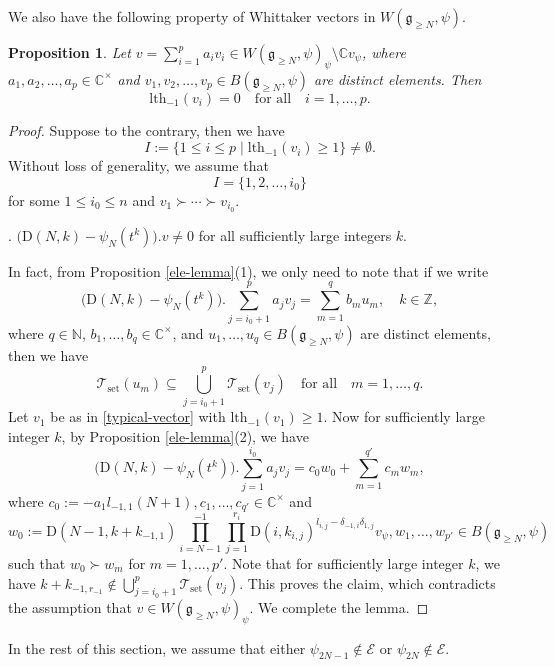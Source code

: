 \documentclass[12pt, a4paper]{amsart}
\newcommand{\fg}{\mathfrak g}
\newcommand{\C}{\mathbb{C}}
\newcommand{\N}{\mathbb N}
\newcommand{\Z}{\mathbb Z}
\newcommand{\rD}{\mathrm{D}}
\theoremstyle{Theorem}
\theoremstyle{Theorem}
\newtheorem{proposition}[thm]{Proposition}
\numberwithin{equation}{section}
\begin{document}
We also have the following property of Whittaker vectors in $W(\fg_{\geq N},\psi)$.
\begin{proposition}\label{some-property-Whit}
Let $v=\sum_{i=1}^{p}a_{i}v_{i}\in W(\fg_{\geq N},\psi)_{\psi}\setminus \C v_{\psi}$,
where $a_{1},a_{2},\dots,a_{p}\in\C^{\times}$ and $v_{1},v_{2},\dots,v_{p}\in B(\fg_{\geq N},\psi)$ are distinct elements.
Then \[\mathrm{lth}_{-1}(v_{i})=0\quad \text{for all}\quad i=1,\dots,p.\]
\end{proposition}
\begin{proof}
Suppose to the contrary, then we have \[I:=\{1\leq i\leq p\mid\mathrm{lth}_{-1}(v_{i})\geq1\}\neq\emptyset.\]
Without loss of generality, we assume that
\[I=\{1,2,\dots,i_{0}\}\]
for some $1\leq i_{0}\leq n$ and $v_{1}\succ\cdots\succ v_{i_{0}}$.

\vspace{2mm}

. $\big(\rD(N,k)-\psi_{N}(t^{k})\big).v\neq0$ for all sufficiently large integers $k$.

In fact, from Proposition \ref{ele-lemma}(1), we only need to note that
if we write \[\big(\rD(N,k)-\psi_{N}(t^{k})\big).\sum_{j=i_{0}+1}^{p}a_{j}v_{j}=
\sum_{m=1}^{q}b_{m}u_{m},\quad k\in\Z,\]
where $q\in\N$, $b_{1},\dots,b_{q}\in\C^{\times}$,
and $u_{1},\dots,u_{q}\in B(\fg_{\geq N},\psi)$ are distinct elements,
then we have
\[\mathcal{T}_{\mathrm{set}}(u_{m})\subseteq\bigcup_{j=i_{0}+1}^{p}\mathcal{T}_{\mathrm{set}}(v_{j})
\quad \text{for all}\quad m=1,\dots,q.\]
Let $v_{1}$ be as in \eqref{typical-vector} with $\mathrm{lth}_{-1}(v_{1})\geq1$.
Now for sufficiently large integer $k$, by Proposition \ref{ele-lemma}(2), we have
\[\big(\rD(N,k)-\psi_{N}(t^{k})\big).\sum_{j=1}^{i_{0}}a_{j}v_{j}=c_{0}w_{0}+\sum_{m=1}^{q'}c_{m}w_{m},\]
where $c_{0}:=-a_{1}l_{-1,1}(N+1),c_{1},\dots,c_{q'}\in\C^{\times}$ and
\[w_{0}:=\rD(N-1,k+k_{-1,1})\prod_{i=N-1}^{-1}\prod_{j=1}^{r_{i}}\rD(i,k_{i,j})^{l_{i,j}-\delta_{-1,i}\delta_{1,j}}v_{\psi},
w_{1},\dots,w_{p'}\in B(\fg_{\geq N},\psi)\] such that $w_{0}\succ w_{m}$ for $m=1,\dots,p'$.
Note that for sufficiently large integer $k$, we have
$k+k_{-1,r_{-1}}\notin \bigcup_{j=i_{0}+1}^{p}\mathcal{T}_{\mathrm{set}}(v_{j})$.
This proves the claim, which contradicts the assumption that $v\in W(\fg_{\geq N},\psi)_{\psi}$. We complete the lemma.
\end{proof}

In the rest of this section, we assume that either $\psi_{2N-1}\notin\mathcal{E}$ or $\psi_{2N}\notin\mathcal{E}$.
\end{document}
